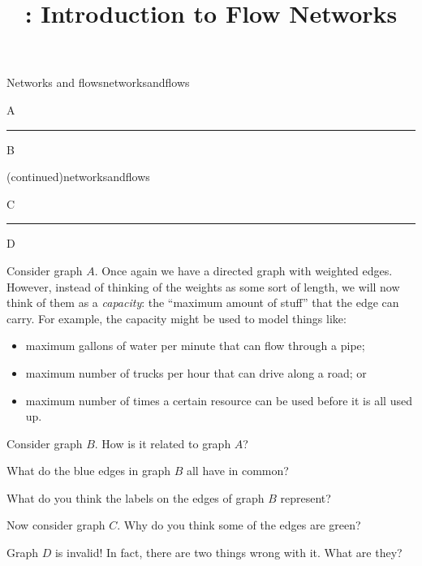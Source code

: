 \documentclass{tufte-handout}
\title{\thecourse: Introduction to Flow Networks}
\date{}
\begin{document}
\maketitle


\begin{model}{Networks and flows}{networksandflows}
  \begin{center}
    {\huge A}
    
  \end{center}
  \bigskip \bigskip

  \hrule \bigskip

  \begin{center}
    {\huge B}
    
  \end{center}
\end{model}

\setcounter{modelcounter}{0}
\begin{model}{(continued)}{networksandflows}
  \begin{center}
    {\huge C}
    
  \end{center}
  \bigskip \bigskip

  \hrule \bigskip

  \begin{center}
    {\huge D}
    
  \end{center}
\end{model}

Consider graph $A$. Once again we have a directed graph with weighted
edges.  However, instead of thinking of the weights as some sort of
length, we will now think of them as a \emph{capacity}: the ``maximum
amount of stuff'' that the edge can carry.  For example, the capacity
might be used to model things like:
\begin{itemize}
\item maximum gallons of water per minute that can flow through a pipe;
\item maximum number of trucks per hour that can drive along a road; or
\item maximum number of times a certain resource can be used before it
  is all used up.
\end{itemize}

\begin{questions}
\item Consider graph $B$.  How is it related to graph $A$?
\item What do the blue edges in graph $B$ all have in common?
\item What do you think the labels on the edges of graph $B$
  represent?
\item Now consider graph $C$.  Why do you think some of the edges are
  green?
\item Graph $D$ is invalid!  In fact, there are two things wrong with
  it.  What are they?
\end{questions}
\end{document}
